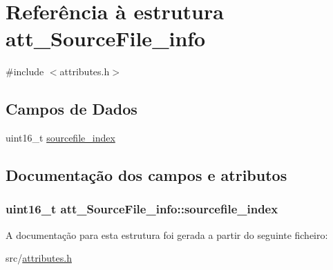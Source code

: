 \hypertarget{structatt__SourceFile__info}{}\section{Referência à estrutura att\+\_\+\+Source\+File\+\_\+info}
\label{structatt__SourceFile__info}


{\ttfamily \#include $<$attributes.\+h$>$}

\subsection*{Campos de Dados}
\begin{DoxyCompactItemize}
\item 
uint16\+\_\+t \hyperlink{structatt__SourceFile__info_a8cd88fda3147c1e7b1270dcc39754f1c}{sourcefile\+\_\+index}
\end{DoxyCompactItemize}


\subsection{Documentação dos campos e atributos}
\subsubsection[{\texorpdfstring{sourcefile\+\_\+index}{sourcefile_index}}]{\setlength{\rightskip}{0pt plus 5cm}uint16\+\_\+t att\+\_\+\+Source\+File\+\_\+info\+::sourcefile\+\_\+index}\hypertarget{structatt__SourceFile__info_a8cd88fda3147c1e7b1270dcc39754f1c}{}\label{structatt__SourceFile__info_a8cd88fda3147c1e7b1270dcc39754f1c}


A documentação para esta estrutura foi gerada a partir do seguinte ficheiro\+:\begin{DoxyCompactItemize}
\item 
src/\hyperlink{attributes_8h}{attributes.\+h}\end{DoxyCompactItemize}
